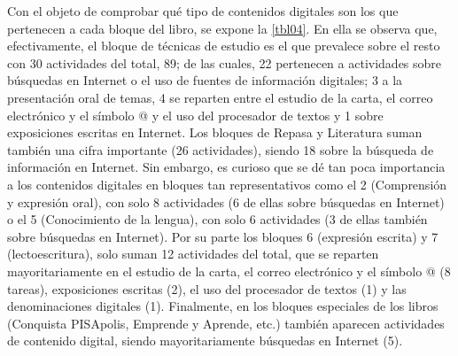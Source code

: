 \documentclass[spanish]{textolivre}
\begin{document}
Con el objeto de comprobar qué tipo de contenidos digitales son los que pertenecen a cada bloque del libro, se expone la \cref{tbl04}. En ella se observa que, efectivamente, el bloque de técnicas de estudio es el que prevalece sobre el resto con 30 actividades del total, 89; de las cuales, 22 pertenecen a actividades sobre búsquedas en Internet o el uso de fuentes de información digitales; 3 a la presentación oral de temas, 4 se reparten entre el estudio de la carta, el correo electrónico y el símbolo @ y el uso del procesador de textos y 1 sobre exposiciones escritas en Internet. Los bloques de Repasa y Literatura suman también una cifra importante (26 actividades), siendo 18 sobre la búsqueda de información en Internet. Sin embargo, es curioso que se dé tan poca importancia a los contenidos digitales en bloques tan representativos como el 2 (Comprensión y expresión oral), con solo 8 actividades (6 de ellas sobre búsquedas en Internet) o el 5 (Conocimiento de la lengua), con solo 6 actividades (3 de ellas también sobre búsquedas en Internet). Por su parte los bloques 6 (expresión escrita) y 7 (lectoescritura), solo suman 12 actividades del total, que se reparten mayoritariamente en el estudio de la carta, el correo electrónico y el símbolo @ (8 tareas), exposiciones escritas (2), el uso del procesador de textos (1) y las denominaciones digitales (1). Finalmente, en los bloques especiales de los libros (Conquista PISApolis, Emprende y Aprende, etc.) también aparecen actividades de contenido digital, siendo mayoritariamente búsquedas en Internet (5). 
\end{document}

